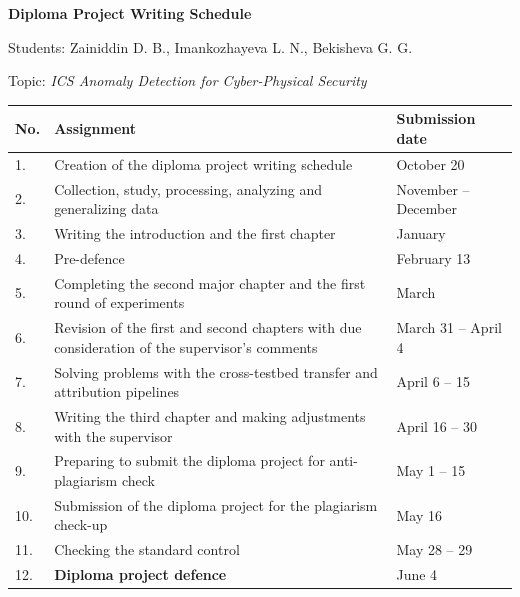 \thispagestyle{empty}

\begin{center}
{\fontsize{14pt}{18pt}\selectfont \textbf{Diploma Project Writing Schedule}\par}
\vspace{0.2cm}
{\fontsize{12pt}{14pt}\selectfont Students: Zainiddin D. B., Imankozhayeva L. N., Bekisheva G. G.\par}
\vspace{0.2cm}
{\fontsize{12pt}{14pt}\selectfont Topic: \textit{ICS Anomaly Detection for Cyber-Physical Security}\par}
\end{center}

\vspace{0.6cm}

\noindent\renewcommand{\arraystretch}{1.3}\begin{tabular}{|p{0.6cm}|p{10.5cm}|p{4.5cm}|}
\hline
\textbf{No.} & \textbf{Assignment} & \textbf{Submission date} \\
\hline
1.  & Creation of the diploma project writing schedule & October 20 \\
\hline
2.  & Collection, study, processing, analyzing and generalizing data & November -- December \\
\hline
3.  & Writing the introduction and the first chapter & January \\
\hline
4.  & Pre-defence & February 13 \\
\hline
5.  & Completing the second major chapter and the first round of experiments & March \\
\hline
6.  & Revision of the first and second chapters with due consideration of the supervisor's comments & March 31 -- April 4 \\
\hline
7.  & Solving problems with the cross-testbed transfer and attribution pipelines & April 6 -- 15 \\
\hline
8.  & Writing the third chapter and making adjustments with the supervisor & April 16 -- 30 \\
\hline
9.  & Preparing to submit the diploma project for anti-plagiarism check & May 1 -- 15 \\
\hline
10. & Submission of the diploma project for the plagiarism check-up & May 16 \\
\hline
11. & Checking the standard control & May 28 -- 29 \\
\hline
12. & \textbf{Diploma project defence} & June 4 \\
\hline
\end{tabular}

